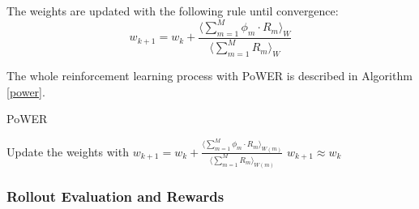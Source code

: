 The weights are updated with the following rule until convergence:
\begin{equation}
	w_{k+1} = w_k+\frac{\langle\sum_{m=1}^{M}\phi_m\cdot R_m\rangle_{W}}{\langle\sum_{m=1}^{M}R_m\rangle_{W}}
\end{equation}

The whole reinforcement learning process with PoWER is described in Algorithm {\ref{power}}.
\begin{algorithm}[H]  
	
	\caption{PoWER}
	\begin{algorithmic}[1]
		\STATE {} 
		\REPEAT 
		\STATE	{}
		\STATE Update the weights with $ w_{k+1} = w_k+\frac{\langle\sum_{m=1}^{M}\phi_m\cdot R_m\rangle_{W(m)}}{\langle\sum_{m=1}^{M}R_m\rangle_{W(m)}}$
		\UNTIL $ w_{k+1} \approx w_k$
	\end{algorithmic} 
	\label{power} 
\end{algorithm}

\subsubsection{Rollout Evaluation and Rewards}